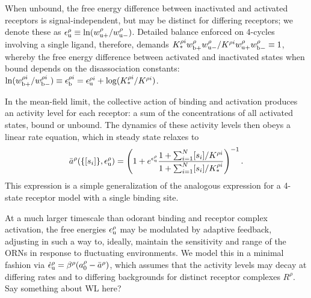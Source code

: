 When unbound, the free energy difference between inactivated and activated receptors is signal-independent, but may be distinct for differing receptors; we denote these as $\epsilon^\rho_{\text u}\equiv\ln(w^\rho_{\text u +}/w^\rho_{\text u -})$. Detailed balance enforced on 4-cycles involving a single ligand, therefore, demands 
$K_*^{\rho i}w_{\text b+}^\rho w_{\text u -}^\rho / 
K^{\rho i} w_{\text u +}^\rho w_{\text b -}^\rho \equiv 1$, 
whereby the free energy difference between activated and inactivated states when bound depends on the disassociation constants:
$\ln(w^{\rho i}_{\text b +}/w^{\rho i}_{\text b -}) \equiv
\epsilon_{\text b}^{\rho i} =
\epsilon_{\text u}^{\rho i} + \log(K_*^{\rho i}/K^{\rho i})$. 

In the mean-field limit, the collective action of binding and activation produces an activity level for each receptor: a sum of the concentrations of all activated states, bound or unbound. 
The dynamics of these activity levels then obeys a linear rate equation, which in steady state relaxes to
\begin{align}
\bar a^\rho(\{[s_i]\}, \epsilon_{\text {u}}^\rho) = \left( 1 + e^{\epsilon^\rho_{\text u}}\frac{1 + \sum_{i=1}^N [s_i]/K^{\rho i}}{1 + \sum_{i=1}^N [s_i]/K_*^{\rho i}}\right)^{-1}.
\label{eq:steady_state_activity}
\end{align}
This expression is a simple generalization of the analogous expression for a 4-state receptor model with a single binding site. 

At a much larger timescale than odorant binding and receptor complex activation, the free energies $\epsilon^\rho_{\text u}$ may be modulated by adaptive feedback, adjusting in such a way to, ideally, maintain the sensitivity and range of the ORNs in response to fluctuating environments. We model this in a minimal fashion via $\dot \epsilon_{\text u}^\rho = \beta^\rho(a_0^\rho - \bar a^\rho)$, which assumes that the activity levels may decay at differing rates and to differing backgrounds for distinct receptor complexes $R^\rho$. {\color {blue} Say something about WL here?}


